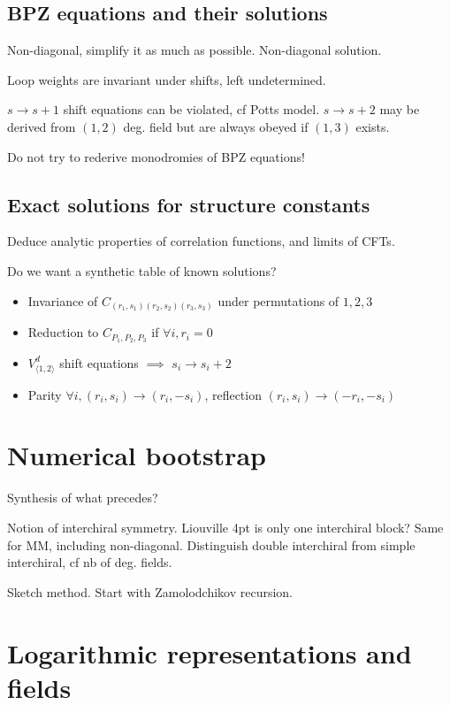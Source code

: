 \documentclass[12pt, a4paper]{article}
\theoremstyle{break}
\begin{document}
\subsection{BPZ equations and their solutions}

Non-diagonal, simplify it as much as possible. Non-diagonal solution. 

Loop weights are invariant under shifts, left undetermined. 

$s\to s+1$ shift equations can be violated, cf Potts model. $s\to s+2$ may be derived from $(1,2)$ deg. field but are always obeyed if $(1,3)$ exists. 

Do not try to rederive monodromies of BPZ equations! 

\subsection{Exact solutions for structure constants}

Deduce analytic properties of correlation functions, and limits of CFTs. 

Do we want a synthetic table of known solutions? 

\begin{itemize}
\item Invariance of $C_{(r_1,s_1)(r_2,s_2)(r_3,s_3)}$ under permutations of $1,2,3$
\item Reduction to $C_{P_1,P_2,P_3}$ if $\forall i, r_i=0$ 
 \item $V_{\langle 1,2\rangle}^d$ shift equations $\implies$ $s_i\to s_i+2$  
 \item Parity $\forall i, (r_i,s_i)\to (r_i,-s_i)$, reflection $(r_i,s_i)\to (-r_i,-s_i)$
\end{itemize}


\section{Numerical bootstrap}

Synthesis of what precedes?

Notion of interchiral symmetry. Liouville 4pt is only one interchiral block? Same for MM, including non-diagonal. Distinguish double interchiral from simple interchiral, cf nb of deg. fields. 

Sketch method. Start with Zamolodchikov recursion.


\section{Logarithmic representations and fields} \label{sec:log}
\end{document}
